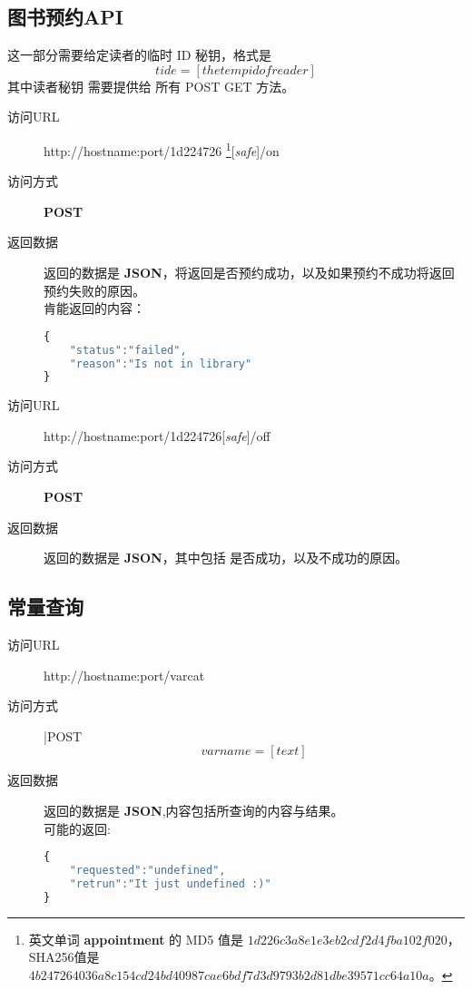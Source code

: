 \documentclass[UTF8]{article}
\def\safe{[\textit{safe}]}
\def\POST{\textbf{POST}}
\def\bfJSON{\textbf{JSON}}
\def\viaurl{\item[访问URL]}
\def\viareq#1{\item[访问方式] #1}
\def\rtdata{\item[返回数据]}
\begin{document}
        \subsection{图书预约API}
        这一部分需要给定读者的临时 ID 秘钥，格式是
        $$tide=[the temp id of reader]$$
        其中读者秘钥 需要提供给 所有 POST GET 方法。
        \begin{description}
	         \viaurl http://hostname:port/1d224726
	         \footnote{
	         	英文单词 \textbf{appointment} 的
	         	MD5 值是 $1d226c3a8e1e3eb2cdf2d4fba102f020$，
	         	SHA256值是 $4b247264036a8c154cd24bd40987cae6bdf7d3d9793b2d81dbe39571cc64a10a$。
	         }\safe/on
		     \viareq{\POST}
		     \rtdata 返回的数据是 \bfJSON ，将返回是否预约成功，以及如果预约不成功将返回预约失败的原因。
		     \\ 肯能返回的内容：
			 \begin{lstlisting}[language=JavaScript]
{
	"status":"failed",
	"reason":"Is not in library"
}
			 \end{lstlisting}
	       \end{description}
        \begin{description}
	        \viaurl http://hostname:port/1d224726\safe/off
	        \viareq{\POST}
	        \rtdata 返回的数据是 \bfJSON ，其中包括 是否成功，以及不成功的原因。
	         \end{description}
        \subsection{常量查询}
        \begin{description}
	        \viaurl http://hostname:port/varcat
	        \viareq{|POST}
	        $$varname=[text]$$
	        \rtdata 返回的数据是 \bfJSON ,内容包括所查询的内容与结果。
	        \\ 可能的返回:
			\begin{lstlisting}[language=JavaScript]
{
	"requested":"undefined",
	"retrun":"It just undefined :)"
}
			\end{lstlisting}
			 \end{description}
\end{document}
